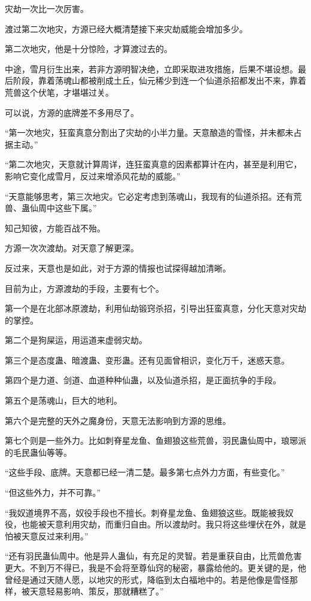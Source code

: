 \begin{this_body}
灾劫一次比一次厉害。

渡过第二次地灾，方源已经大概清楚接下来灾劫威能会增加多少。

第二次地灾，他是十分惊险，才算渡过去的。

中途，雪月衍生出来，若非方源明智决绝，立即采取进攻措施，后果不堪设想。最后阶段，靠着荡魂山都被削成土丘，仙元稀少到连一个仙道杀招都发出不来，靠着荒兽这个伏笔，才堪堪过关。

可以说，方源的底牌差不多用尽了。

“第一次地灾，狂蛮真意分割出了灾劫的小半力量。天意酿造的雪怪，并未都未占据主动。”

“第二次地灾，天意就计算周详，连狂蛮真意的因素都算计在内，甚至是利用它，影响它变化成雪月，反过来增添风花劫的威能。”

“天意能够思考，第三次地灾。它必定考虑到荡魂山，我现有的仙道杀招。还有荒兽、蛊仙周中这些下属。”

知己知彼，方能百战不殆。

方源一次次渡劫。对天意了解更深。

反过来，天意也是如此，对于方源的情报也试探得越加清晰。

目前为止，方源渡劫的手段，主要有七个。

第一个是在北部冰原渡劫，利用仙劫锻窍杀招，引导出狂蛮真意，分化天意对灾劫的掌控。

第二个是狗屎运，用运道来虚弱灾劫。

第三个是态度蛊、暗渡蛊、变形蛊。还有见面曾相识，变化万千，迷惑天意。

第四个是力道、剑道、血道种种仙蛊，以及仙道杀招，是正面抗争的手段。

第五个是荡魂山，巨大的地利。

第六个是完整的天外之魔身份，天意无法影响到方源的思维。

第七个则是一些外力。比如刺脊星龙鱼、鱼翅狼这些荒兽，羽民蛊仙周中，琅琊派的毛民蛊仙等等。

“这些手段、底牌。天意都已经一清二楚。最多第七点外力方面，有些变化。”

“但这些外力，并不可靠。”

“我奴道境界不高，奴役手段也不擅长。刺脊星龙鱼、鱼翅狼这些。既能被我奴役，也能被天意利用灾劫，而重归自由。所以渡劫时。我只将这些埋伏在外，就是怕被天意反过来利用。”

“还有羽民蛊仙周中。他是异人蛊仙，有充足的灵智。若是重获自由，比荒兽危害更大。不到万不得已，我是不会将至尊仙窍的秘密，暴露给他的。更关键的是，他曾经是通过天随人愿，以地灾的形式，降临到太白福地中的。若是他像是雪怪那样，被天意轻易影响、策反，那就糟糕了。”


\end{this_body}
